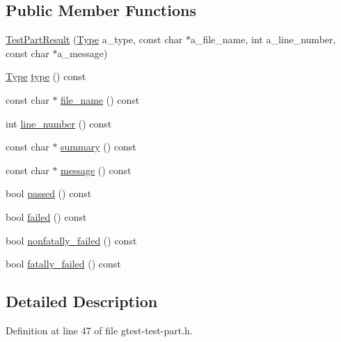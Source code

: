\subsection*{Public Member Functions}
\begin{DoxyCompactItemize}
\item 
\hyperlink{classtesting_1_1_test_part_result_a6409eb519c1cd514aab2426c8f40737f}{Test\+Part\+Result} (\hyperlink{classtesting_1_1_test_part_result_a65ae656b33fdfdfffaf34858778a52d5}{Type} a\+\_\+type, const char $\ast$a\+\_\+file\+\_\+name, int a\+\_\+line\+\_\+number, const char $\ast$a\+\_\+message)
\item 
\hyperlink{classtesting_1_1_test_part_result_a65ae656b33fdfdfffaf34858778a52d5}{Type} \hyperlink{classtesting_1_1_test_part_result_ae852bf8693f066078c74c34345531940}{type} () const 
\item 
const char $\ast$ \hyperlink{classtesting_1_1_test_part_result_a5d8742dc28ddb880cd2391edb9fc2c9b}{file\+\_\+name} () const 
\item 
int \hyperlink{classtesting_1_1_test_part_result_a174900cf4403d23784af34f50e7b0a46}{line\+\_\+number} () const 
\item 
const char $\ast$ \hyperlink{classtesting_1_1_test_part_result_af0d4f960b453ce087c581fe13817b2a3}{summary} () const 
\item 
const char $\ast$ \hyperlink{classtesting_1_1_test_part_result_aae73962246be4d200e2c1d04246a708a}{message} () const 
\item 
bool \hyperlink{classtesting_1_1_test_part_result_a901bd62d9fbe7f39826a9d02ab2bdaec}{passed} () const 
\item 
bool \hyperlink{classtesting_1_1_test_part_result_aaf835515fb53eb1aa01c1798b05e61f6}{failed} () const 
\item 
bool \hyperlink{classtesting_1_1_test_part_result_a7bb08c87fbc1664f9fcca1504339ed29}{nonfatally\+\_\+failed} () const 
\item 
bool \hyperlink{classtesting_1_1_test_part_result_a34d31718b5fc6c06f73d03e8dbb1aa9e}{fatally\+\_\+failed} () const 
\end{DoxyCompactItemize}


\subsection{Detailed Description}


Definition at line 47 of file gtest-\/test-\/part.\+h.




